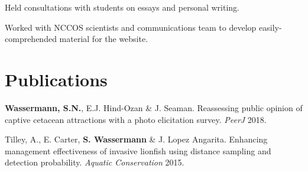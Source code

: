 \documentclass[a4paper]{deedy-resume} %
\begin{document}
\begin{flushleft}


Held consultations with students on essays and personal writing.

\sectionspace %



Worked with NCCOS scientists and communications team to develop easily-comprehended material for the website.

\sectionspace 
\sectionspace



\section{Publications} 

\begin{tightitemize}
\item \textbf{Wassermann, S.N.}, E.J. Hind-Ozan \& J. Seaman. 
Reassessing public opinion of captive cetacean attractions with a photo elicitation survey. \textit{PeerJ} 2018.
\item Tilley, A., E. Carter, \textbf{S. Wassermann} \& J. Lopez Angarita. Enhancing management effectiveness of invasive lionfish using distance sampling and detection probability. \textit{Aquatic Conservation} 2015.
\end{tightitemize}

\sectionspace


\end{flushleft}
\end{document}
